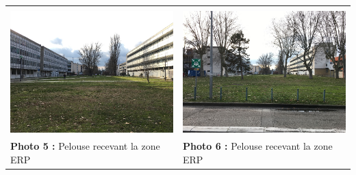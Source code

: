 \documentclass[hidelinks, paper=a4, fontsize=13pt]{report}
\begin{document}
\begin{center}
\begin{tabular}{ll}
\vspace{0.2 cm}\\
\includegraphics[width=.45\textwidth]{Annexes/Exports/Photo_5} & \includegraphics[width=.45\textwidth]{Annexes/Exports/Photo_6} \\
\textbf{Photo 5 :} Pelouse recevant la zone ERP & \textbf{Photo 6 :} Pelouse recevant la zone ERP\\
\end{tabular}
\end{center}

\newpage
\end{document}
